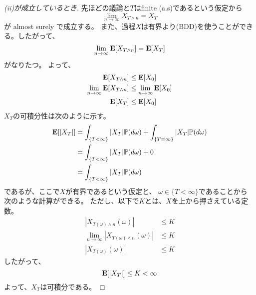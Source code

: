 \begin{proof}
        [(ii)が成立しているとき]
        先ほどの議論と$T$はfinite (a.s)であるという仮定から
        \[
          \lim_{n \to \infty}X_{T \wedge n} = X_T
        \]
        が almost surely で成立する。
        また、過程$X$は有界より(BDD)を使うことができる。したがって、
        \[
          \lim_{n \to \infty}{\mathbf{E}}[X_{T \wedge n}] = {\mathbf{E}}[X_T]
        \]
        がなりたつ。
        よって、
        \begin{align*}
          {\mathbf{E}}[X_{T \wedge n}] &\leq {\mathbf{E}}[X_0] \\
          \lim_{n \to \infty}{\mathbf{E}}[X_{T \wedge n}] &\leq \lim_{n \to \infty}{\mathbf{E}}[X_0] \\
          {\mathbf{E}}[X_T] &\leq {\mathbf{E}}[X_0]
        \end{align*}
        $X_T$の可積分性は次のように示す。
        \begin{align*}
          {\mathbf{E}}[|X_T|] &= \int_{\{T < \infty\}}|X_T|{\mathbb{P}}(d\omega) + \int_{\{T = \infty\}}|X_T|{\mathbb{P}}(d\omega) \\
          &= \int_{\{T < \infty\}}|X_T|{\mathbb{P}}(d\omega) + 0\\
          &= \int_{\{T < \infty\}}|X_T|{\mathbb{P}}(d\omega)
        \end{align*}
        であるが、ここで$X$が有界であるという仮定と、
        $\omega \in \{T < \infty\}$であることから
        次のような計算ができる。
        ただし、以下で$K$とは、$X$を上から押さえている定数。
        \begin{align*}
          |X_{T(\omega) \wedge n}(\omega)| &\leq K \\
          \lim_{n \to \infty}|X_{T(\omega) \wedge n}(\omega)| &\leq K \\
          |X_{T(\omega)}(\omega)| &\leq K
        \end{align*}
        したがって、
        \[
          {\mathbf{E}}[|X_T|] \leq K < \infty
        \]
        よって、$X_T$は可積分である。


\end{proof}
